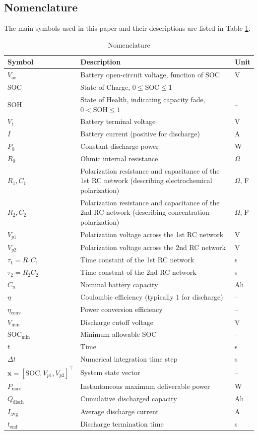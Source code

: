 \subsection{Nomenclature}
The main symbols used in this paper and their descriptions are listed in Table \ref{tab:symbols}.
\begin{table}[H]
\centering
\caption{Nomenclature}
\label{tab:symbols}
\begin{tabular}{p{}p{}p{}}
\toprule
\textbf{Symbol} & \textbf{Description} & \textbf{Unit} \\
\midrule
$V_{\text{oc}}$ & Battery open-circuit voltage, function of SOC & V \\
SOC & State of Charge, $0 \leq \text{SOC} \leq 1$ & -- \\
SOH & State of Health, indicating capacity fade, $0 < \text{SOH} \leq 1$ & -- \\
$V_t$ & Battery terminal voltage & V \\
$I$ & Battery current (positive for discharge) & A \\
$P_0$ & Constant discharge power & W \\
$R_0$ & Ohmic internal resistance & $\Omega$ \\
$R_1, C_1$ & Polarization resistance and capacitance of the 1st RC network (describing electrochemical polarization) & $\Omega$, F \\
$R_2, C_2$ & Polarization resistance and capacitance of the 2nd RC network (describing concentration polarization) & $\Omega$, F \\
$V_{p1}$ & Polarization voltage across the 1st RC network & V \\
$V_{p2}$ & Polarization voltage across the 2nd RC network & V \\
$\tau_1 = R_1C_1$ & Time constant of the 1st RC network & s \\
$\tau_2 = R_2C_2$ & Time constant of the 2nd RC network & s \\
$C_n$ & Nominal battery capacity & Ah \\
$\eta$ & Coulombic efficiency (typically 1 for discharge) & -- \\
$\eta_{\text{conv}}$ & Power conversion efficiency & -- \\
$V_{\text{min}}$ & Discharge cutoff voltage & V \\
$\text{SOC}_{\text{min}}$ & Minimum allowable SOC & -- \\
$t$ & Time & s \\
$\Delta t$ & Numerical integration time step & s \\
$\mathbf{x} = [\text{SOC}, V_{p1}, V_{p2}]^\top$ & System state vector & -- \\
$P_{\text{max}}$ & Instantaneous maximum deliverable power & W \\
$Q_{\text{disch}}$ & Cumulative discharged capacity & Ah \\
$I_{\text{avg}}$ & Average discharge current & A \\
$t_{\text{end}}$ & Discharge termination time & s \\
\bottomrule
\end{tabular}
\end{table}